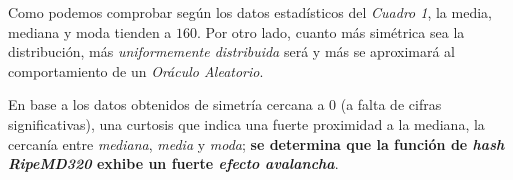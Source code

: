 \documentclass[11pt,a4paper]{article}
\begin{document}
Como podemos comprobar según los datos estadísticos del \emph{Cuadro 1}, la
media, mediana y moda tienden a $160$. Por otro lado, cuanto más
simétrica sea la distribución, más \emph{uniformemente distribuida} será y
más se aproximará al comportamiento de un \emph{Oráculo Aleatorio}.

En base a los datos obtenidos de simetría cercana a $0$ (a falta de
cifras significativas), una curtosis que indica una fuerte proximidad
a la mediana, la cercanía entre \emph{mediana}, \emph{media} y
\emph{moda}; \textbf{se determina que la función de \emph{hash
    RipeMD320} exhibe un fuerte \emph{efecto avalancha}}.
\end{document}
